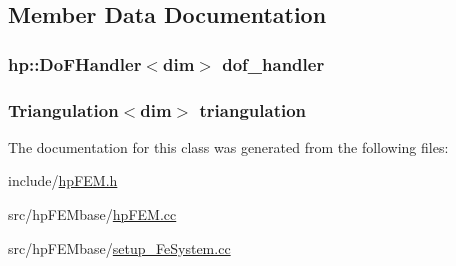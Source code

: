 \subsection{Member Data Documentation}
\subsubsection[{dof\-\_\-handler}]{\setlength{\rightskip}{0pt plus 5cm}hp\-::\-Do\-F\-Handler$<$dim$>$ dof\-\_\-handler}\label{classhp_f_e_m_ab4df20fb431f370878adc06e19280d62}
\subsubsection[{triangulation}]{\setlength{\rightskip}{0pt plus 5cm}Triangulation$<$dim$>$ triangulation}\label{classhp_f_e_m_a1e604d1e68926caf1ebc67d2a7451783}


The documentation for this class was generated from the following files\-:\begin{DoxyCompactItemize}
\item 
include/\hyperlink{hp_f_e_m_8h}{hp\-F\-E\-M.\-h}\item 
src/hp\-F\-E\-Mbase/\hyperlink{hp_f_e_m_8cc}{hp\-F\-E\-M.\-cc}\item 
src/hp\-F\-E\-Mbase/\hyperlink{setup___fe_system_8cc}{setup\-\_\-\-Fe\-System.\-cc}\end{DoxyCompactItemize}
